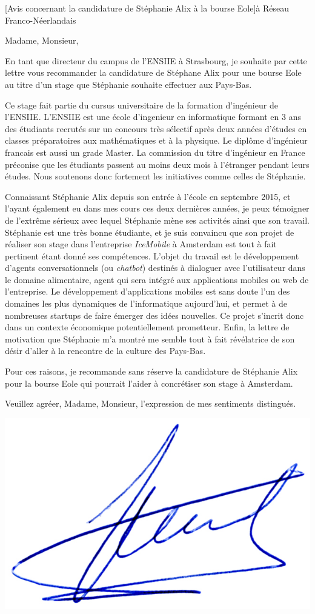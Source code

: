 \documentclass[a4paper,10pt]{article}
\begin{document}

\begin{letter}[Avis concernant la candidature de Stéphanie Alix à la bourse Eole]{à}%
{Réseau Franco-Néerlandais}

\vspace{-1cm}
Madame, Monsieur,

En tant que directeur du campus de l'ENSIIE à Strasbourg, je souhaite par cette
lettre vous recommander la candidature de Stéphane Alix pour une bourse Eole au
titre d'un stage que Stéphanie souhaite effectuer aux Pays-Bas.

Ce stage  fait partie  du cursus  universitaire de  la formation  d'ingénieur de
l'ENSIIE.  L'ENSIIE est  une école d'ingenieur en informatique formant  en 3 ans
des étudiants recrutés sur un concours  très sélectif après deux années d'études
en  classes  préparatoires aux  mathématiques  et  à  la physique.   Le  diplôme
d'ingénieur  francais  est  aussi  un  grade  Master.  La  commission  du  titre
d'ingénieur en France  préconise que les étudiants passent au  moins deux mois à
l'étranger pendant leurs études.  Nous  soutenons donc fortement les initiatives
comme celles de Stéphanie.
 
Connaissant Stéphanie  Alix depuis son  entrée à  l'école en septembre  2015, et
l'ayant également eu dans mes cours ces deux dernières années, je peux témoigner
de l'extrême  sérieux avec  lequel Stéphanie  mène ses  activités ainsi  que son
travail. Stéphanie  est une très bonne  étudiante, et je suis  convaincu que son
projet de  réaliser son stage  dans l'entreprise \textit{IceMobile}  à Amsterdam
est tout à fait pertinent étant donné ses compétences. L'objet du travail est le
développement d'agents conversationnels (ou \emph{chatbot}) destinés à dialoguer
avec  l'utilisateur dans  le domaine  alimentaire,  agent qui  sera intégré  aux
applications  mobiles ou  web de  l'entreprise. Le  développement d'applications
mobiles est sans  doute l'un des domaines les plus  dynamiques de l'informatique
aujourd'hui,  et permet  à de  nombreuses startups  de faire  émerger des  idées
nouvelles. Ce projet  s'incrit donc dans un  contexte économique potentiellement
prometteur.  Enfin, la  lettre de motivation que Stéphanie m'a  montré me semble
tout à fait  révélatrice de son désir  d'aller à la rencontre de  la culture des
Pays-Bas.


Pour ces raisons, je recommande sans réserve la candidature de Stéphanie Alix
pour la bourse Eole qui pourrait l'aider à concrétiser son stage à Amsterdam.

Veuillez agréer, Madame, Monsieur, l'expression de mes sentiments distingués. 
\end{letter}
\begin{flushright}
\includegraphics[width=.2\textwidth]{signgenaud.jpg}
\end{flushright}
\end{document}
